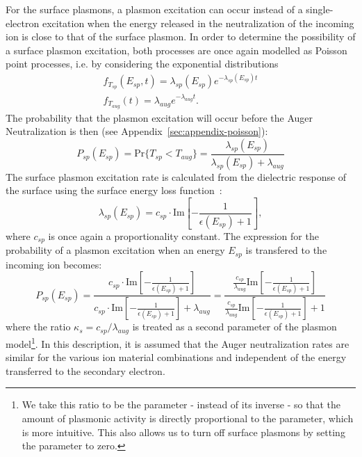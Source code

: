 \begin{refsection}
For the surface plasmons, a plasmon excitation can occur instead of a 
single-electron excitation when the energy released in the neutralization of 
the incoming ion is close to that of the surface plasmon. In order to determine the 
possibility of a surface plasmon excitation, both processes are once again 
modelled as Poisson point processes, i.e. by considering the exponential 
distributions
\begin{eqnarray} 
f_{T_{sp}}(E_{sp}, t) = \lambda_{sp} (E_{sp}) e^{-\lambda_{sp}(E_{sp}) t}\\ 
f_{T_{aug}}(t) = \lambda_{aug} e^{-\lambda_{aug} t}.
\end{eqnarray} 
The probability that the plasmon excitation will occur 
before the Auger Neutralization is then (see Appendix~\ref{sec:appendix-poisson}): 
\begin{equation} \label{quotas:eq-sp_poisson}
P_{sp}(E_{sp}) = \text{Pr}\{T_{sp} < T_{aug}\} = 
\frac{\lambda_{sp}(E_{sp})}{\lambda_{sp}(E_{sp}) + \lambda_{aug}} 
\end{equation} 
The surface plasmon excitation rate is calculated from the dielectric response of 
the surface using the surface energy loss function~\cite{Raether1980}: 
\begin{equation} 
\lambda_{sp}(E_{sp}) = c_{sp} \cdot \text{Im}\left[-\frac{1}{\epsilon(E_{sp}) 
+ 1}\right],
\end{equation} 
where $c_{sp}$ is once again a proportionality constant.
The expression for the probability of a plasmon 
excitation when an energy $E_{sp}$ is transfered to the incoming ion becomes: 
\begin{equation} \label{quotas:eq-sp_prob}
P_{sp}(E_{sp}) = \frac{c_{sp} \cdot \text{Im}\left[-\frac{1}{\epsilon(E_{sp}) + 
1}\right]}{c_{sp}  \cdot \text{Im}\left[-\frac{1}{\epsilon(E_{sp}) + 1}\right] + 
\lambda_{aug}} = \frac{ \frac{c_{sp}}{\lambda_{aug}} 
\text{Im}\left[-\frac{1}{\epsilon(E_{sp}) + 1}\right]}{\frac{c_{sp}}{\lambda_{aug}} 
\text{Im}\left[-\frac{1}{\epsilon(E_{sp}) + 1}\right] + 1} 
\end{equation} 
where the ratio $\kappa_s = c_{sp}/\lambda_{aug}$ is treated as a second parameter 
of the plasmon model\footnote{We take this ratio to be the parameter - instead 
of its inverse - so that the amount of plasmonic activity is directly 
proportional to the parameter, which is more intuitive. This also allows us to 
turn off surface plasmons by setting the parameter to zero.}. In this 
description, it is assumed that the Auger neutralization rates are similar 
for the various ion material combinations and independent of the energy 
transferred to the secondary electron. 
 

\end{refsection}

